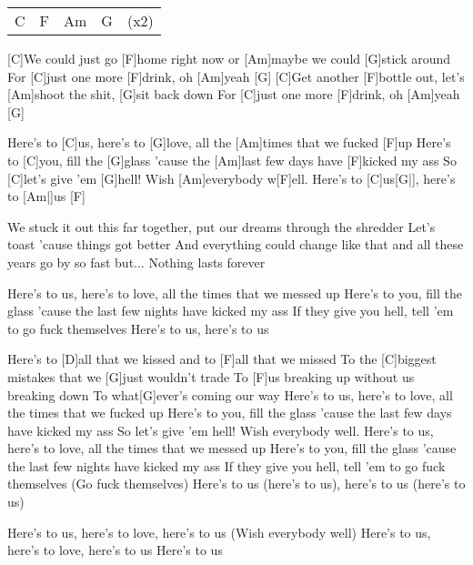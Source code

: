 

\begin{guitar}
	{\footnotesize\begin{tabular}{l|l|l|ll}
			C & F & Am & G & (x2)
	\end{tabular}}
	
	[C]We could just go [F]home right now or [Am]maybe we could [G]stick around
	For [C]just one more [F]drink, oh [Am]yeah [G]{}
	[C]Get another [F]bottle out, let's [Am]shoot the shit, [G]sit back down
	For [C]just one more [F]drink, oh [Am]yeah [G]{}
	
	Here's to [C]us, here's to [G]love, all the [Am]times that we fucked [F]up
	Here's to [C]you, fill the [G]glass 'cause the [Am]last few days have [F]kicked my ass
	So [C]let's give 'em [G]hell! Wish [Am]everybody w[F]ell.
	Here's to [C]us[G|], here's to [Am|]{us} [F]{}
	
	We stuck it out this far together, put our dreams through the shredder
	Let's toast 'cause things got better
	And everything could change like that and all these years go by so fast but...
	Nothing lasts forever
	
	Here's to us, here's to love, all the times that we messed up
	Here's to you, fill the glass 'cause the last few nights have kicked my ass
	If they give you hell, tell 'em to go fuck themselves
	Here's to us, here's to us
	
	Here's to [D]all that we kissed and to [F]all that we missed
	To the [C]biggest mistakes that we [G]just wouldn't trade
	To [F]us breaking up without us breaking down
	To what[G]ever's coming our way
	\pagebreak
	Here's to us, here's to love, all the times that we fucked up
	Here's to you, fill the glass 'cause the last few days have kicked my ass
	So let's give 'em hell! Wish everybody well.
	Here's to us, here's to love, all the times that we messed up
	Here's to you, fill the glass 'cause the last few nights have kicked my ass
	If they give you hell, tell 'em to go fuck themselves (Go fuck themselves)
	Here's to us (here's to us), here's to us (here's to us)
	
	Here's to us, here's to love, here's to us (Wish everybody well)
	Here's to us, here's to love, here's to us
	Here's to us
\end{guitar}